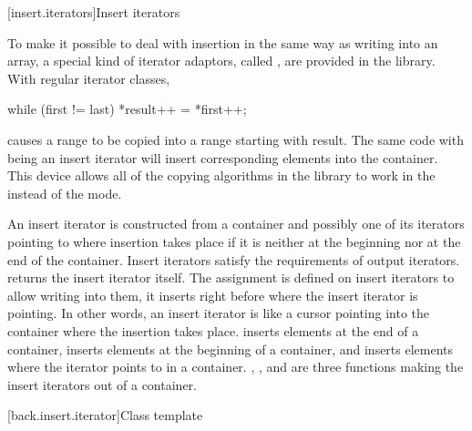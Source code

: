 [insert.iterators]{Insert iterators}

\pnum
To make it possible to deal with insertion in the same way as writing into an array, a special kind of iterator
adaptors, called
,
are provided in the library.
With regular iterator classes,

\begin{codeblock}
while (first != last) *result++ = *first++;
\end{codeblock}

causes a range 
to be copied into a range starting with result.
The same code with
being an insert iterator will insert corresponding elements into the container.
This device allows all of the
copying algorithms in the library to work in the
instead of the  mode.

\pnum
An insert iterator is constructed from a container and possibly one of its iterators pointing to where
insertion takes place if it is neither at the beginning nor at the end of the container.
Insert iterators satisfy the requirements of output iterators.
returns the insert iterator itself.
The assignment
is defined on insert iterators to allow writing into them, it inserts
right before where the insert iterator is pointing.
In other words, an insert iterator is like a cursor pointing into the
container where the insertion takes place.
inserts elements at the end of a container,
inserts elements at the beginning of a container, and
inserts elements where the iterator points to in a container.
,
,
and
are three
functions making the insert iterators out of a container.

[back.insert.iterator]{Class template }

